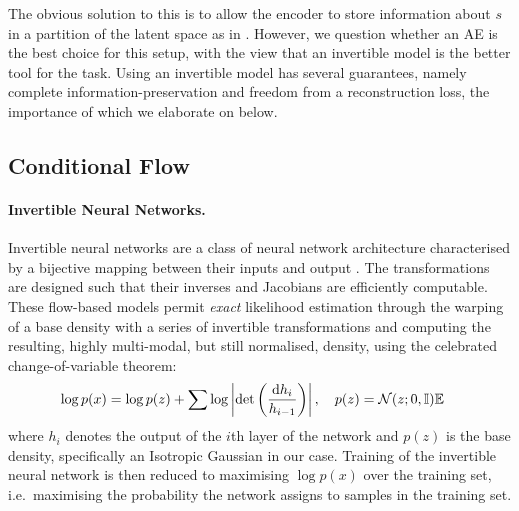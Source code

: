 The obvious solution to this is to allow the encoder to store information about $s$ in a partition
of the latent space as in  \citet{creager2019flexibly}. 
%
However, we question whether an \ac{AE} is
the best choice for this setup, with the view that an invertible model is the better tool for the
task. 
%
Using an invertible model has several guarantees, namely complete information-preservation
and freedom from a reconstruction loss, the importance of which we elaborate on below.

\subsection{Conditional Flow}\label{cflow}
\paragraph{Invertible Neural Networks.}
Invertible neural networks are a class of neural network architecture characterised by a bijective
mapping between their inputs and output \citep{Dinh2014}. 
%
The transformations are designed such that their inverses and Jacobians are efficiently computable.
%
These flow-based models permit \emph{exact} likelihood estimation \citep{normflows2015} through the
warping of a base density with a series of invertible transformations and computing the resulting,
highly multi-modal, but still normalised, density, using the celebrated change-of-variable theorem:
%
\begin{align}
\begin{split}
  \log p(x) &= \log p(z) + 
   \sum \log \left| \det\left( \frac{\diff h_i}{ h_{i-1}}\right) \right|, %
  \quad p(z) = \gN(z; 0, \mathbb{I})
  \mathbb{E}
  \label{eq:changeofvariables}
\end{split}
\end{align}
%
where $h_i$ denotes the output of the \(i\)th layer of the network and $p(z)$ is the base density,
specifically an Isotropic Gaussian in our case. 
%
Training of the invertible neural network is then reduced to maximising $\log p(x)$ over the
training set, i.e.\ maximising the probability the network assigns to samples in the training set.


